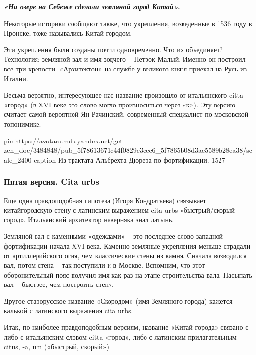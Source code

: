 \begin{leftbar}
  \begingroup
    \em\Large\bfseries\color{blue}
«На озере на Себеже сделали земляной город Китай».
  \endgroup
\end{leftbar}

Некоторые историки сообщают также, что укрепления, возведенные в 1536 году в
Пронске, тоже назывались Китай-городом.

Эти укрепления были созданы почти одновременно. Что их объединяет? Технология:
земляной вал и имя зодчего – Петрок Малый. Именно он построил все три крепости.
«Архитектон» на службе у великого князя приехал на Русь из Италии.

Весьма вероятно, интересующее нас название произошло от итальянского citta
«город» (в XVI веке это слово могло произноситься через «к»). Эту версию
считает самой вероятной Ян Рачинский, современный специалист по московской
топонимике.

\ifcmt
pic https://avatars.mds.yandex.net/get-zen_doc/3484848/pub_5f78613671c44f0829e3cec6_5f7865b08d3ae5589b28ea38/scale_2400
caption Из трактата Альбрехта Дюрера по фортификации. 1527
\fi

\subsubsection{Пятая версия. Cita urbs}

Еще одна правдоподобная гипотеза (Игоря Кондратьева) связывает китайгородскую
стену с латинским выражением cita urbs «быстрый/скорый город». Итальянский
архитектор наверняка знал латынь.

Земляной вал с каменными «одеждами» – это последнее слово западной фортификации
начала XVI века. Каменно-земляные укрепления меньше страдали от артиллерийского
огня, чем классические стены из камня. Сначала возводился вал, потом стена –
так поступили и в Москве. Вспомним, что этот оборонительный пояс получил имя
как раз на этапе строительства вала. Насыпать вал – быстрее, чем построить
стену.

Другое старорусское название «Скородом» (имя Земляного города) кажется калькой
с латинского выражения cita urbs.

Итак, по наиболее правдоподобным версиям, название «Китай-города» связано с
либо с итальянским словом citta «город», либо с латинским прилагательным citus,
-a, um («быстрый, скорый»).



